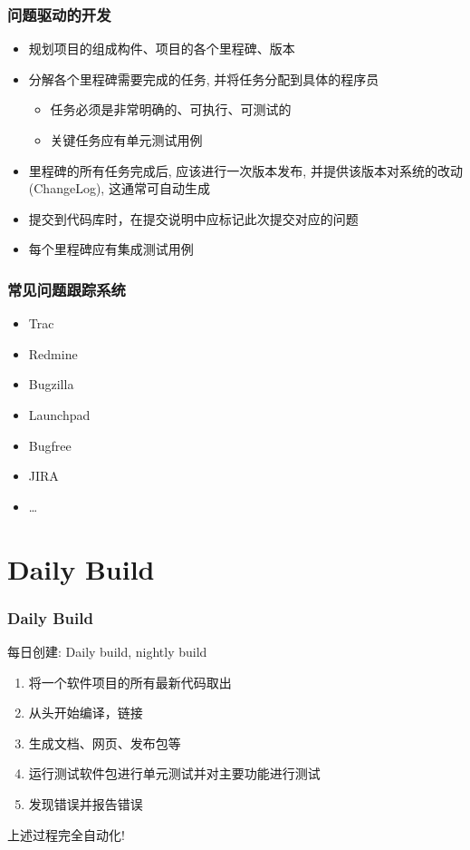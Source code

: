 \documentclass[compress]{beamer}
\begin{document}
\begin{frame}
    \frametitle{问题驱动的开发}
    \begin{itemize}
        \item 规划项目的组成构件、项目的各个里程碑、版本
        \item 分解各个里程碑需要完成的任务, 并将任务分配到具体的程序员
            \begin{itemize}
                \item 任务必须是非常明确的、可执行、可测试的
                \item 关键任务应有单元测试用例
            \end{itemize}
        \item 里程碑的所有任务完成后, 应该进行一次版本发布,
            并提供该版本对系统的改动(ChangeLog), 这通常可自动生成
        \item 提交到代码库时，在提交说明中应标记此次提交对应的问题

        \item 每个里程碑应有集成测试用例
    \end{itemize} 
\end{frame}

\begin{frame}
    \frametitle{常见问题跟踪系统}
    \begin{itemize}
        \item Trac
        \item Redmine
        \item Bugzilla
        \item Launchpad
        \item Bugfree
        \item JIRA
        \item \dots
    \end{itemize}
\end{frame}

\section{Daily Build}

\begin{frame}
  \frametitle{Daily Build}
   每日创建: Daily build, nightly build
   \begin{enumerate}
	 \item 将一个软件项目的所有最新代码取出
	 \item 从头开始编译，链接
	 \item 生成文档、网页、发布包等
	 \item 运行测试软件包进行单元测试并对主要功能进行测试
	 \item 发现错误并报告错误
   \end{enumerate}
   上述过程完全自动化!
   
\end{frame}
\end{document}
